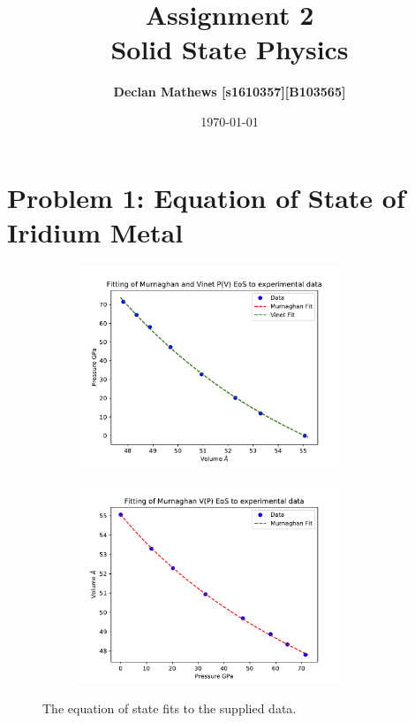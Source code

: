\documentclass[12pt]{article}
\title{\bf Assignment 2 \\[2ex] 
	\rm\normalsize Solid State Physics}
\date{\today}
\author{\bf Declan Mathews [s1610357][B103565]}
\begin{document}
	\maketitle
	\section{Problem 1: Equation of State of Iridium Metal}
			\begin{figure}[h!!!!!]
				\centering
				\begin{subfigure}[t]{0.5\textwidth}
					\includegraphics[width=8cm]{../PVfits}
					\label{fig:EoSa}
				\end{subfigure}%
				\begin{subfigure}[t]{0.5\textwidth}
					\includegraphics[width=8cm]{../VPfit}
					\label{fig:EoSb}
				\end{subfigure}
				\caption{The equation of state fits to the supplied data.}
				\label{fig:EoS}
			\end{figure}
		
\end{document}

